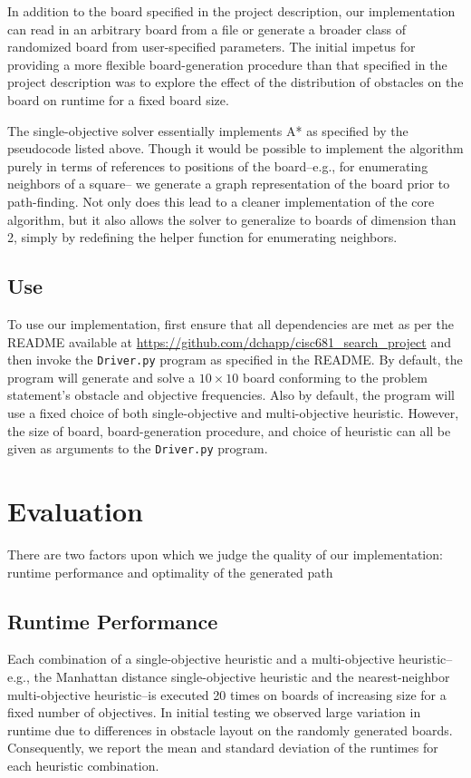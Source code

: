 \documentclass[12pt, conference, compsocconf]{IEEEtran}
\begin{document}
In addition to the board specified in the project description, our
implementation can read in an arbitrary board from a file or generate a broader
class of randomized board from user-specified parameters.  The initial impetus
for providing a more flexible board-generation procedure than that specified in
the project description was to explore the effect of the distribution of
obstacles on the board on runtime for a fixed board size.

The single-objective solver essentially implements A* as specified by the pseudocode
listed above. Though it would be possible to implement the algorithm purely in terms
of references to positions of the board--e.g., for enumerating neighbors of a square--
we generate a graph representation of the board prior to path-finding. Not only does 
this lead to a cleaner implementation of the core algorithm, but it also allows the 
solver to generalize to boards of dimension than 2, simply by redefining the helper 
function for enumerating neighbors. 

\subsection{Use}
To use our implementation, first ensure that all dependencies are met as per
the README available at \url{https://github.com/dchapp/cisc681_search_project}
and then invoke the \texttt{Driver.py} program as specified in the README.
By default, the program will generate and solve a $10 \times 10$ board conforming 
to the problem statement's obstacle and objective frequencies.  
Also by default, the program will use a fixed choice of both single-objective and
multi-objective heuristic. However, the size of board, board-generation
procedure, and choice of heuristic can all be given as arguments to the
\texttt{Driver.py} program.

\section{Evaluation}
There are two factors upon which we judge the quality of our implementation:
runtime performance and optimality of the generated path

\subsection{Runtime Performance}
Each combination of a single-objective heuristic and a multi-objective
heuristic--e.g., the Manhattan distance single-objective heuristic and the
nearest-neighbor multi-objective heuristic--is executed 20 times on boards of
increasing size for a fixed number of objectives.  In initial testing we
observed large variation in runtime due to differences in obstacle layout on
the randomly generated boards.  Consequently, we report the mean and standard
deviation of the runtimes for each heuristic combination.
\end{document}
